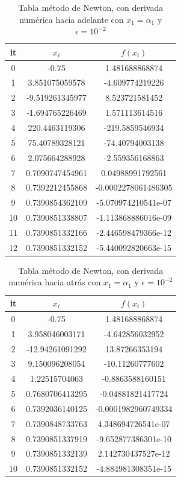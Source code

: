 \documentclass{article} %
\begin{document}
\begin{table}[H]
\centering
\begin{tabular}{|c|c|c|}
\hline
it & $x_i$ & $f(x_i)$\\
\hline
0 & -0.75 & 1.481688868874\\
1 & 3.851075059578 & -4.609774219226\\
2 & -9.519261345977 & 8.523721581452\\
3 & -1.694765226469 & 1.571113614516\\
4 & 220.4463119306 & -219.5859546934\\
5 & 75.40789328121 & -74.40794003138\\
6 & 2.075664288928 & -2.559356168863\\
7 & 0.7090747454961 & 0.04988991792561\\
8 & 0.7392212455868 & -0.0002278061486305\\
9 & 0.7390854362109 & -5.070974210541e-07\\
10 & 0.7390851338807 & -1.113868886016e-09\\
11 & 0.7390851332166 & -2.446598479366e-12\\
12 & 0.7390851332152 & -5.440092820663e-15\\
\hline
\end{tabular}
\caption{Tabla método de Newton, con derivada numérica hacia adelante con $x_1 = \alpha_1$ y $\epsilon = 10^{-2}$}
\end{table}

\begin{table}
\centering
\begin{tabular}{|c|c|c|}
\hline
it & $x_i$ & $f(x_i)$\\
\hline
0 & -0.75 & 1.481688868874\\
1 & 3.958046003171 & -4.642856032952\\
2 & -12.94261091292 & 13.87266353194\\
3 & 9.150096208054 & -10.11260777602\\
4 & 1.22515704063 & -0.8863588160151\\
5 & 0.7680706413295 & -0.04881821417724\\
6 & 0.7392036140125 & -0.0001982960749334\\
7 & 0.7390848733763 & 4.348694726541e-07\\
8 & 0.7390851337919 & -9.652877386301e-10\\
9 & 0.7390851332139 & 2.142730437527e-12\\
10 & 0.7390851332152 & -4.884981308351e-15\\
\hline
\end{tabular}
\caption{Tabla método de Newton, con derivada numérica hacia atrás con $x_1 = \alpha_1$ y $\epsilon = 10^{-2}$}
\end{table}
\end{document}
